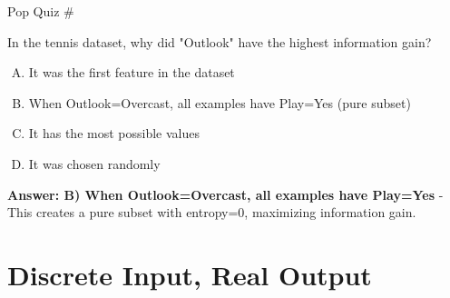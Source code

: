 \documentclass[usenames,dvipsnames]{beamer}
\begin{document}
\begin{frame}{Pop Quiz \#\thepopquiz}
\begin{tcolorbox}[colback=blue!5!white,colframe=blue!75!black,title=Quick Question!]
In the tennis dataset, why did "Outlook" have the highest information gain?
\begin{enumerate}[A)]
\item It was the first feature in the dataset
\item When Outlook=Overcast, all examples have Play=Yes (pure subset)
\item It has the most possible values
\item It was chosen randomly
\end{enumerate}
\pause
\textbf{Answer: B) When Outlook=Overcast, all examples have Play=Yes} - This creates a pure subset with entropy=0, maximizing information gain.
\end{tcolorbox}
\end{frame}

\section{Discrete Input, Real Output}
\end{document}
